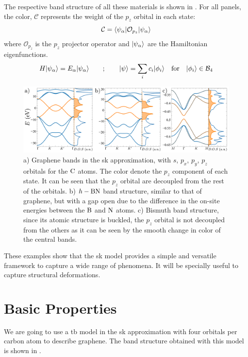 The respective band structure of all these materials is shown in .
For all panels, the color, $\mathcal{C}$ represents the weight of the $p_z$ orbital in each state:
\begin{equation*}
   \mathcal{C} = \langle\psi_{\alpha}|\mathcal{O}_{p_z}|\psi_{\alpha}\rangle
\end{equation*}
where $\mathcal{O}_{p_z}$ is the $p_z$ projector operator and $|\psi_{\alpha}\rangle$ are the Hamiltonian eigenfunctions.
\begin{equation*}
  H|\psi_{\alpha}\rangle = E_{\alpha}|\psi_{\alpha}\rangle \qquad ; \qquad
   |\psi\rangle = \sum_i c_i|\phi_i\rangle \quad
   \text{for} \quad|\phi_i\rangle\in\mathcal{B}_4
\end{equation*}
\begin{figure}[h!]
\centering
\includegraphics{graphene/figures/banddos.pdf}
\vspace{-15pt}
\caption{a) Graphene bands in the \ac{sk} approximation, with $s$, $p_x$, $p_y$, $p_z$ orbitals for the $\ce{C}$ atoms. The color denote the $p_z$ component of each state. It can be seen that the $p_z$ orbital are decoupled from the rest of the orbitals. b) $h-\ce{BN}$ band structure, similar to that of graphene, but with a gap open due to the difference in the on-site energies between the $\ce{B}$ and $\ce{N}$ atoms. c) Bismuth band structure, since its atomic structure is buckled, the $p_z$ orbital is not decoupled from the others as it can be seen by the smooth change in color of the central bands.}
\label{SKbands}
\end{figure}
\FloatBarrier

These examples show that the \ac{sk} model provides a simple and versatile framework to capture a wide range of phenomena. It will be specially useful to capture structural deformations.


\section{Basic Properties}
\label{sec:graphene_basic_properties}
%
%
We are going to use a \ac{tb} model in the \ac{sk} approximation with four orbitals per carbon atom to describe graphene. The band structure obtained with this model is shown in .

